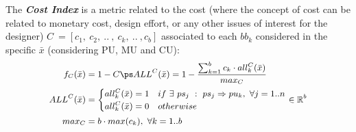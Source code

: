 %
The \textbf{\textit{Cost Index}} \cite{bib24_b}\cite{bib24_c} is a metric related to the cost (where the concept of cost can be related to monetary cost, design effort, or any other issues of interest for the designer) $C \ =[c_{1}, \ c_{2}, \ .. \ , \ c_{k}, \ .. \ , c_{b}]$ associated to each \textit{$bb_{k}$} considered in the specific \textit{$\bar x$} (considering PU, MU and CU):
%
\begin{equation} \label{eq16}
\small
\begin{aligned} 
f_{C}(\bar x) &= 1 - C \ps ALL^{C}(\bar x) = 1 - \frac{\sum^b_{k=1} c_{k} \cdot all^{C}_{k}(\bar x)}{max_{C}} \\
ALL^{C}(\bar x) &= \begin{cases} 
all^{C}_{k}(\bar x) = 1 & if \ \exists \ ps_{j} \ : \ ps_{j} \Rightarrow pu_{k}, \ \forall j=1..n\\ 
all^{C}_{k}(\bar x) = 0 & otherwise
\end{cases} \in \mathbb{R}^{b} \\
max_C &= b \cdot max(c_{k}), \ \forall k=1..b
\end{aligned}
\end{equation}
%
